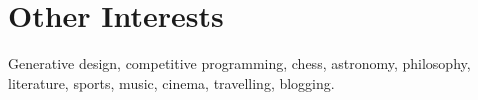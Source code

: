 \documentclass[letterpaper,11pt]{article}
\newcommand{\resumeItem}[2]{
    \item \small{\textbf{#1}{ #2 \vspace{-2pt}}}
}
\newcommand{\resumeSubItem}[2]{\resumeItem{#1}{#2}\vspace{-4pt}}
\newcommand{\resumeSubHeadingListStart}{\begin{itemize}[leftmargin=*]}
\newcommand{\resumeSubHeadingListEnd}{\end{itemize}}
\begin{document}

\section{\faThumbsUp \hspace{0.2cm} \Large Other Interests}

    Generative design, competitive programming, chess, astronomy, philosophy, literature, sports, music, cinema, travelling, blogging.
  
\end{document}
